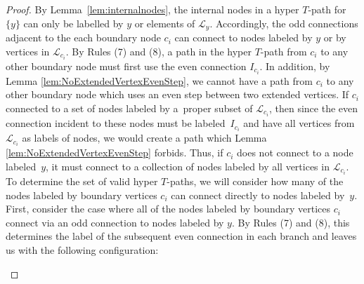 \documentclass[10pt,a4paper]{amsart}
\numberwithin{equation}{section}
\begin{document}
\begin{proof}
By Lemma~\ref{lem:internalnodes}, the internal nodes in a hyper $T$-path for $\{y\}$ can only be labelled by $y$ or elements of $\mathcal{L}_y$. Accordingly, the odd connections adjacent to the each boundary node $c_i$ can connect to nodes labeled by $y$ or by vertices in $\mathcal{L}_{c_i}$. By Rules (7) and (8), a path in the hyper $T$-path from $c_i$ to any other boundary node must first use the even connection $I_{c_i}$. In addition, by Lemma \ref{lem:NoExtendedVertexEvenStep}, we cannot have a path from $c_i$ to any other boundary node which uses an even step between two extended vertices. If $c_i$ connected to a set of nodes labeled by a~proper subset of $\mathcal{L}_{c_i}$, then since the even connection incident to these nodes must be labeled~$I_{c_i}$ and have all vertices from $\mathcal{L}_{c_i}$ as labels of nodes, we would create a path which Lemma \ref{lem:NoExtendedVertexEvenStep} forbids. Thus, if $c_i$ does not connect to a node labeled~$y$, it must connect to a collection of nodes labeled by all vertices in $\mathcal{L}_{c_i}$. To determine the set of valid hyper $T$-paths, we will consider how many of the nodes labeled by boundary vertices $c_i$ can connect directly to nodes labeled by~$y$.
First, consider the case where all of the nodes labeled by boundary vertices $c_i$ connect via an odd connection to nodes labeled by $y$. By Rules (7) and (8), this determines the label of the subsequent even connection in each branch and leaves us with the following configuration:
\begin{center}
\end{center}
\end{proof}
\end{document}
